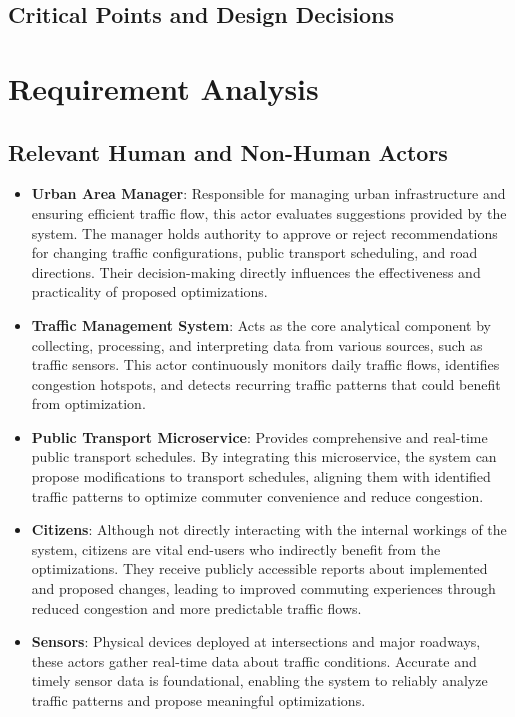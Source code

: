 \documentclass[a4paper,12pt]{article}
\begin{document}
\subsection{Critical Points and Design Decisions}

\newpage 



\subtitle{Type 2}

\section{Requirement Analysis}
\subsection{Relevant Human and Non-Human Actors}

\begin{itemize}
    \item \textbf{Urban Area Manager}:
Responsible for managing urban infrastructure and ensuring efficient traffic flow, this actor evaluates suggestions provided by the system. The manager holds authority to approve or reject recommendations for changing traffic configurations, public transport scheduling, and road directions. Their decision-making directly influences the effectiveness and practicality of proposed optimizations.

\item \textbf{Traffic Management System}:
Acts as the core analytical component by collecting, processing, and interpreting data from various sources, such as traffic sensors. This actor continuously monitors daily traffic flows, identifies congestion hotspots, and detects recurring traffic patterns that could benefit from optimization.

\item \textbf{Public Transport Microservice}:
Provides comprehensive and real-time public transport schedules. By integrating this microservice, the system can propose modifications to transport schedules, aligning them with identified traffic patterns to optimize commuter convenience and reduce congestion.

\item \textbf{Citizens}:
Although not directly interacting with the internal workings of the system, citizens are vital end-users who indirectly benefit from the optimizations. They receive publicly accessible reports about implemented and proposed changes, leading to improved commuting experiences through reduced congestion and more predictable traffic flows.

\item \textbf{Sensors}:
Physical devices deployed at intersections and major roadways, these actors gather real-time data about traffic conditions. Accurate and timely sensor data is foundational, enabling the system to reliably analyze traffic patterns and propose meaningful optimizations.
\end{itemize}
\end{document}
